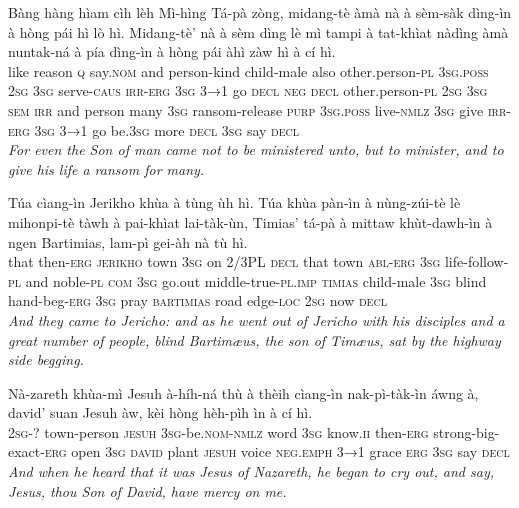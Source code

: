 \documentclass[11pt,a4paper]{article}
\begin{document}
\begin{exe}
\gll Bàng hàng hìam cìh lèh Mì-hìng Tá-pà zòng, midang-tè àmà nà à sèm-sàk dìng-ìn à hòng pái hì lò hì. Midang-tè' nà à sèm dìng lè mì tampi à tat-khìat nàdìng àmà nuntak-ná à pía dìng-ìn à hòng pái àhì zàw hì à cí hì. \\
     like reason \textsc{q} say.\textsc{nom} and person-kind child-male also other.person-\textsc{pl} \textsc{3sg}.\textsc{poss} \textsc{2sg} \textsc{3sg} serve-\textsc{caus} \textsc{irr}-\textsc{erg} \textsc{3sg} \textsc{3→1} go \textsc{decl} \textsc{neg} \textsc{decl} other.person-\textsc{pl} \textsc{2sg} \textsc{3sg} \textsc{sem} \textsc{irr} and person many \textsc{3sg} ransom-release \textsc{purp} \textsc{3sg}.\textsc{poss} live-\textsc{nmlz} \textsc{3sg} give \textsc{irr}-\textsc{erg} \textsc{3sg} \textsc{3→1} go be.\textsc{3sg} more \textsc{decl} \textsc{3sg} say \textsc{decl} \\
\glt \textcolor{kjvcolor}{\textit{For even the Son of man came not to be ministered unto, but to minister, and to give his life a ransom for many.}}

\gll Túa cìang-ìn Jerikho khùa à tùng ùh hì. Túa khùa pàn-ìn à nùng-zúi-tè lè mihonpi-tè tàwh à pai-khìat lai-tàk-ùn, Timias' tá-pà à mittaw khùt-dawh-ìn à ngen Bartimias, lam-pì gei-àh nà tù hì. \\
     that then-\textsc{erg} \textsc{jerikho} town \textsc{3sg} on 2/3PL \textsc{decl} that town \textsc{abl}-\textsc{erg} \textsc{3sg} life-follow-\textsc{pl} and noble-\textsc{pl} \textsc{com} \textsc{3sg} go.out middle-true-\textsc{pl}.\textsc{imp} \textsc{timias} child-male \textsc{3sg} blind hand-beg-\textsc{erg} \textsc{3sg} pray \textsc{bartimias} road edge-\textsc{loc} \textsc{2sg} now \textsc{decl} \\
\glt \textcolor{kjvcolor}{\textit{And they came to Jericho: and as he went out of Jericho with his disciples and a great number of people, blind Bartimæus, the son of Timæus, sat by the highway side begging.}}

\gll Nà-zareth khùa-mì Jesuh à-híh-ná thù à thèih cìang-ìn nak-pì-tàk-ìn áwng à, david' suan Jesuh àw, kèi hòng hèh-pìh ìn à cí hì. \\
     \textsc{2sg}-? town-person \textsc{jesuh} \textsc{3sg}-be.\textsc{nom}-\textsc{nmlz} word \textsc{3sg} know.\textsc{ii} then-\textsc{erg} strong-big-exact-\textsc{erg} open \textsc{3sg} \textsc{david} plant \textsc{jesuh} voice \textsc{neg}.\textsc{emph} \textsc{3→1} grace \textsc{erg} \textsc{3sg} say \textsc{decl} \\
\glt \textcolor{kjvcolor}{\textit{And when he heard that it was Jesus of Nazareth, he began to cry out, and say, Jesus, thou Son of David, have mercy on me.}}


\end{exe}
\end{document}
